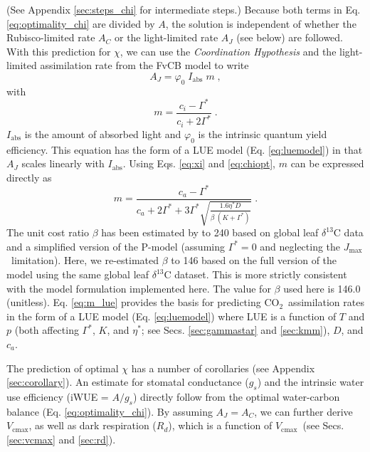 \documentclass[gmd, manuscript]{copernicus}
\newcommand{\coo}{CO$_2$}
\newcommand{\vcmax}{$V_{\text{cmax}}$}
\newcommand{\jmax}{$J_{\text{max}}$}
\begin{document}
(See Appendix \ref{sec:steps_chi} for intermediate steps.) Because both terms in Eq. \ref{eq:optimality_chi} are divided by $A$, the solution is independent of whether the Rubisco-limited rate $A_C$ or the light-limited rate $A_J$ (see below) are followed. With this prediction for $\chi$, we can use the \textit{Coordination Hypothesis} \citep{chen93, haxeltine96, maire12po} and the light-limited assimilation rate from the FvCB model to write
\begin{equation}
\label{eq:aj}
        A_J = \varphi_0 \; I_{\mathrm{abs}}\;m \;,
\end{equation}
with
\begin{equation}
\label{eq:m_co2limitation}
    m = \frac{c_i - \Gamma^{\ast}}{c_i + 2\Gamma^{\ast}}\;.
\end{equation}
$I_{\mathrm{abs}}$ is the amount of absorbed light and $\varphi_0$ is the intrinsic quantum yield efficiency. This equation has the form of a LUE model (Eq. \ref{eq:luemodel}) in that $A_J$ scales linearly with $I_{\mathrm{abs}}$. Using Eqs. \ref{eq:xi} and \ref{eq:chiopt}, $m$ can be expressed directly as
\begin{equation}
\label{eq:m_lue}
    m = \frac{c_a - \Gamma^{\ast}}{c_a + 2 \Gamma^{\ast} + 3 \Gamma^{\ast} \sqrt{\frac{1.6 \eta^{\ast} D }{\beta\;(K+\Gamma^{\ast})}}} \;.
\end{equation}
The unit cost ratio $\beta$ has been estimated by \citet{wang17natpl} to 240 based on global leaf $\delta^{13}$C data and a simplified version of the P-model (assuming $\Gamma^\ast = 0$ and neglecting the \jmax\ limitation). Here, we re-estimated $\beta$ to 146 based on the full version of the model using the same global leaf $\delta^{13}$C dataset. This is more strictly consistent with the model formulation implemented here. The value for $\beta$ used here is 146.0 (unitless). Eq. \ref{eq:m_lue} provides the basis for predicting \coo\ assimilation rates in the form of a LUE model (Eq. \ref{eq:luemodel}) where LUE is a function of $T$ and $p$ (both affecting $\Gamma^{\ast}$, $K$, and $\eta^\ast$; see Secs. \ref{sec:gammastar} and \ref{sec:kmm}), $D$, and $c_a$.  

The prediction of optimal $\chi$ has a number of corollaries (see Appendix \ref{sec:corollary}). An estimate for stomatal conductance ($g_s$) and the intrinsic water use efficiency (iWUE = $A/g_s$) directly follow from the optimal water-carbon balance (Eq. \ref{eq:optimality_chi}). By assuming $A_J=A_C$, we can further derive \vcmax , as well as dark respiration ($R_d$), which is a function of \vcmax\ (see Secs. \ref{sec:vcmax} and \ref{sec:rd}).
\end{document}
